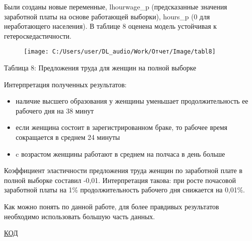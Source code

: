 \documentclass[a4paper,12pt]{article}
\begin{document}
Были созданы новые переменные, lhourwage\_p (предсказанные значения заработной платы на основе работающей выборки), hours\_p (0 для неработающего населения). В таблице 8 оценена модель устойчивая к гетероскедастичности.

\begin{figure}[H]
	\centering
	\texttt{[image: C:/Users/user/DL\_audio/Work/Отчет/Image/tabl8]}
	\label{fig:tabl8}
\end{figure}
\begin{center}
	Таблица 8: Предложения труда для женщин на полной выборке
\end{center}
Интерпретация полученных результатов:
\begin{itemize}
\item	наличие высшего образования у женщины уменьшает продолжительность ее рабочего дня на 38 минут
\item если женщина состоит в зарегистрированном браке, то рабочее время сокращается в среднем 24 минуты
\item c возрастом женщины работают в среднем на полчаса в день больше
\end{itemize}
Коэффициент эластичности предложения труда женщин по заработной плате в полной выборке составил -0,01. Интерпретация такова: при росте почасовой заработной платы на 1\% продолжительность рабочего дня снижается на 0,01\%.

Как можно понять по данной работе, для более правдивых результатов необходимо использовать большую часть данных. 

\newpage

\Huge
\href{}{КОД}
 
\end{document}
